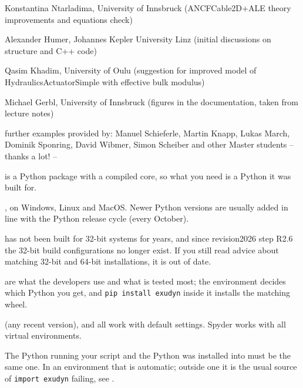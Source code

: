  \item Konstantina Ntarladima, University of Innsbruck (ANCFCable2D+ALE theory improvements and equations check)
  \item Alexander Humer, Johannes Kepler University Linz (initial discussions on structure and C++ code)
  \item Qasim Khadim, University of Oulu (suggestion for improved model of HydraulicsActuatorSimple with effective bulk modulus)
  \item Michael Gerbl, University of Innsbruck (figures in the documentation, taken from lecture notes)
  \item further examples provided by: Manuel Schieferle, Martin Knapp, Lukas March, Dominik Sponring, David Wibmer, Simon Scheiber and other Master students
\ei
-- thanks a lot! --
%
\newpage
{}
%

\codeName is a Python package with a compiled core, so what you need is a Python it was built for.

, on Windows, Linux and
MacOS. Newer Python versions are usually added in line with the Python release cycle (every
October).

 \codeName has not been built for 32-bit systems for years, and since
revision2026 step R2.6 the 32-bit build configurations no longer exist. If you still read advice
about matching 32-bit and 64-bit installations, it is out of date.

\bi
  \item {} are what the developers use and what is tested most; the
        environment decides which Python you get, and \texttt{pip install exudyn} inside it
        installs the matching wheel.
  \item {} (any recent version),  and 
        all work with default settings. Spyder works with all virtual environments.
  \item The Python running your script and the Python \codeName was installed into must be the
        same one. In an environment that is automatic; outside one it is the usual source of
        \texttt{import exudyn} failing, see .
\ei

